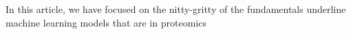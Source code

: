 In this article, we have focused on the nitty-gritty of the fundamentals underline machine learning models that are in  proteomics